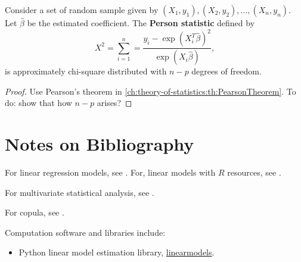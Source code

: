 \begin{refsection}
\begin{lemma}
Consider a set of random sample given by $(X_1,y_1),(X_2,y_2),...,(X_n,y_n)$.
Let $\hat{\beta}$ be the estimated coefficient.
The \textbf{Person statistic} defined by
$$X^2 = \sum_{i=1}^{n}=\frac{y_i - \exp(X_i^T\hat{\beta})^2}{\exp(X_i\hat{\beta})},$$
is approximately chi-square distributed with $n-p$ degrees of freedom.	
\end{lemma}
\begin{proof}
Use Pearson's theorem in \autoref{ch:theory-of-statistics:th:PearsonTheorem}. To do: show that how $n-p$ arises?
\end{proof}







\section{Notes on Bibliography}

For linear regression models, see \cite{kutner2003applied}\cite{seber2012linear}. For, linear models with $R$ resources, see \cite{faraway2014linear}.


For multivariate statistical analysis, see \cite{johnson2007applied}\cite{anderson2009introduction}.

For copula, see \cite{Ruschendorf2013mathematical}\cite{lindskog2000modelling}\cite{mcneil2015quantitative}\cite{cherubini2004copula}.


Computation software and libraries include:
\begin{itemize}
	\item Python linear model estimation library, \href{https://bashtage.github.io/linearmodels/doc/}{linearmodels}.
\end{itemize}

\printbibliography
\end{refsection}
